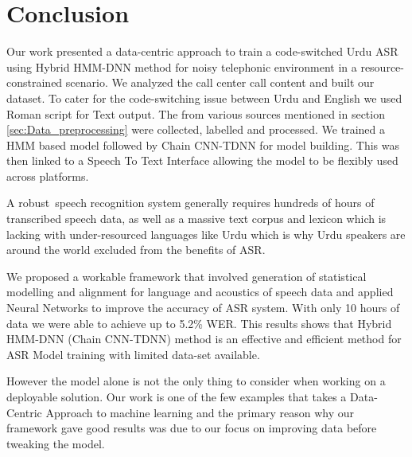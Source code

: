 \documentclass[lettersize,journal]{IEEEtran}
\begin{document}
\section{Conclusion} %
\label{cha:discussion_conclusion}
Our work presented a data-centric approach to train a code-switched Urdu ASR using Hybrid HMM-DNN method for noisy telephonic environment in a resource-constrained scenario. We analyzed the call center call content and built our dataset. To cater for the code-switching issue between Urdu and English we used Roman script for Text output. The from various sources mentioned in section \ref{sec:Data_preprocessing} were collected, labelled and processed. We trained a HMM based model followed by Chain CNN-TDNN for model building. This was then linked to a Speech To Text Interface allowing the model to be flexibly used across platforms.


A robust speech recognition system generally requires hundreds of hours of transcribed speech data, as well as a massive text corpus and lexicon which is lacking with under-resourced languages like Urdu which is why Urdu speakers are around the world excluded from the benefits of ASR.

We proposed a workable framework that involved generation of statistical modelling and alignment for language and acoustics of speech data and applied Neural Networks to improve the accuracy of ASR system. With only 10 hours of data we were able to achieve up to 5.2\% WER. This results shows that Hybrid HMM-DNN (Chain CNN-TDNN) method is an effective and efficient method for ASR Model training with limited data-set available. 

However the model alone is not the only thing to consider when working on a deployable solution. Our work is one of the few examples that takes a Data-Centric Approach to machine learning and the primary reason why our framework gave good results was due to our focus on improving data before tweaking the model.
\end{document}
